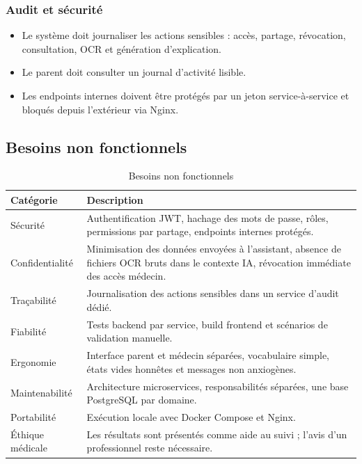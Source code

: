 \subsubsection*{Audit et sécurité}
\begin{itemize}
    \item Le système doit journaliser les actions sensibles : accès, partage, révocation, consultation, OCR et génération d'explication.
    \item Le parent doit consulter un journal d'activité lisible.
    \item Les endpoints internes doivent être protégés par un jeton service-à-service et bloqués depuis l'extérieur via Nginx.
\end{itemize}

\subsection{Besoins non fonctionnels}
\label{sec:besoins-non-fonctionnels}

\begin{table}[htbp]
\centering
\caption{Besoins non fonctionnels}
\label{tab:bnf}
\begin{tabularx}{\textwidth}{|l|X|}
\hline
\textbf{Catégorie} & \textbf{Description} \\
\hline
Sécurité & Authentification JWT, hachage des mots de passe, rôles, permissions par partage, endpoints internes protégés. \\
\hline
Confidentialité & Minimisation des données envoyées à l'assistant, absence de fichiers OCR bruts dans le contexte IA, révocation immédiate des accès médecin. \\
\hline
Traçabilité & Journalisation des actions sensibles dans un service d'audit dédié. \\
\hline
Fiabilité & Tests backend par service, build frontend et scénarios de validation manuelle. \\
\hline
Ergonomie & Interface parent et médecin séparées, vocabulaire simple, états vides honnêtes et messages non anxiogènes. \\
\hline
Maintenabilité & Architecture microservices, responsabilités séparées, une base PostgreSQL par domaine. \\
\hline
Portabilité & Exécution locale avec Docker Compose et Nginx. \\
\hline
Éthique médicale & Les résultats sont présentés comme aide au suivi ; l'avis d'un professionnel reste nécessaire. \\
\hline
\end{tabularx}
\end{table}

